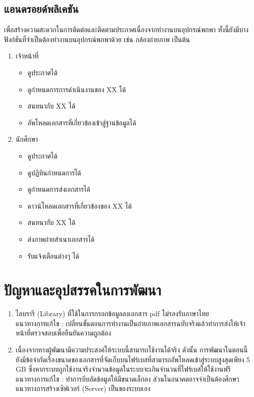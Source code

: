 	\subsection{แอนดรอยด์พลิเคชัน}
	เพื่อสร้างความสะดวกในการติดต่อและติดตามประกาศเนื่องจากทำงานบนอุปกรณ์พกพา ทั้งนี้ยังมีบางฟังก์ชันที่จำเป็นต้องทำงานบนอุปกรณ์พกพาด้วย เช่น กล้องถ่ายภาพ เป็นต้น
		\begin{enumerate}
			\item เจ้าหน้าที่
			\begin{itemize}
				\item ดูประกาศได้
				\item ดูกำหนดการการดำเนินงานของ XX ได้
				\item สนทนากับ XX ได้
				\item อัพโหลดเอกสารที่เกี่ยวข้องเข้าสู่ฐานข้อมูลได้
			\end{itemize}
			\item นักศึกษา
			\begin{itemize}
				\item ดูประกาศได้
				\item ดูปฏิทินกำหนดการได้
				\item ดูกำหนดการส่งเอกสารได้
				\item ดาวน์โหลดเอกสารที่เกี่ยวข้องของ XX ได้
				\item สนทนากับ XX ได้
				\item ส่งภาพถ่ายสำเนาเอกสารได้
				\item รับแจ้งเตือนต่างๆ ได้
			\end{itemize}
		\end{enumerate}
	
\section{ปัญหาและอุปสรรคในการพัฒนา}
  \begin{enumerate}
   \item ไลบรารี (Library) ที่ใช้ในการกรอกข้อมูลลงเอกสาร pdf ไม่รองรับภาษาไทย \\ 
   แนวทางการแก้ไข : เปลี่ยนขั้นตอนการทำงานเป็นถ่ายภาพเอกสารฉบับจริงแล้วทำการส่งให้เจ้าหน้าที่ตรวจสอบเพื่อยืนยันความถูกต้อง
   
    \item เนื่องจากทางผู้พัฒนามีความประสงค์ให้ระบบนี้สามารถใช้งานได้จริง ดังนั้น การพัฒนาในตอนนี้ยังมีข้อจำกัดเรื่องขนาดของเอกสารที่จัดเก็บบนไฟร์เบสที่สามารถอัพโหลดเข้าสู่ระบบสูงสุดเพียง 5 GB ซึ่งหากระบบถูกใช้งานจริงจำนวนข้อมูลในระบบจะเกินจำนวนที่ไฟร์เบสให้ใช้งานฟรี \\ 
    แนวทางการแก้ไข : ทำการบีบอัดข้อมูลให้มีขนาดเล็กลง ส่วนในอนาคตอาจจำเป็นต้องศึกษาแนวทางการสร้างเซิฟเวอร์ (Server) เป็นของระบบเอง
    
  \end{enumerate}


